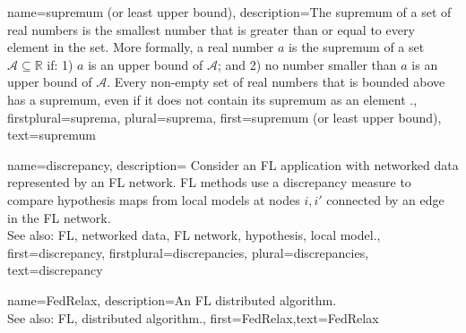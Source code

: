 {name={supremum (or least upper bound)},
  description={The supremum of a set of real numbers is 
   the smallest number that is greater than or equal to every element in the set. More formally, a 
   real number $a$ is the supremum of a set $\mathcal{A} \subseteq \mathbb{R}$ if: 1) $a$ 
   is an upper bound of $\mathcal{A}$; and 2) no number smaller than $a$ is an upper bound of $\mathcal{A}$. 
   Every non-empty set of real numbers that is bounded above has a supremum, even if it does 
  not contain its supremum as an element \cite[Sec.~1.4]{RudinBookPrinciplesMatheAnalysis}.},
  firstplural={suprema}, 
  plural={suprema}, 
   first={supremum (or least upper bound)},
   text={supremum}
}

{name={discrepancy},
	description={
		Consider an FL application with networked data 
		represented by an FL network. FL methods use a discrepancy measure 
		to compare hypothesis maps from local models at nodes $i,i'$ 
		connected by an edge in the FL network.
					\\ 
		See also: FL, networked data, FL network, hypothesis, local model.},
  first={discrepancy},
  firstplural={discrepancies}, 
  plural={discrepancies}, 
  text={discrepancy}
}

{name={FedRelax},
	description={An FL distributed algorithm. 
		\\ 
		See also: FL, distributed algorithm.},
	first={FedRelax},text={FedRelax}
} 

